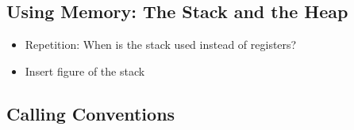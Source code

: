 

\subsection{Using Memory: The Stack and the Heap}

\begin{itemize}
	\item Repetition: When is the stack used instead of registers?
	\item Insert figure of the stack
\end{itemize}

\subsection{Calling Conventions}


%
%
%
